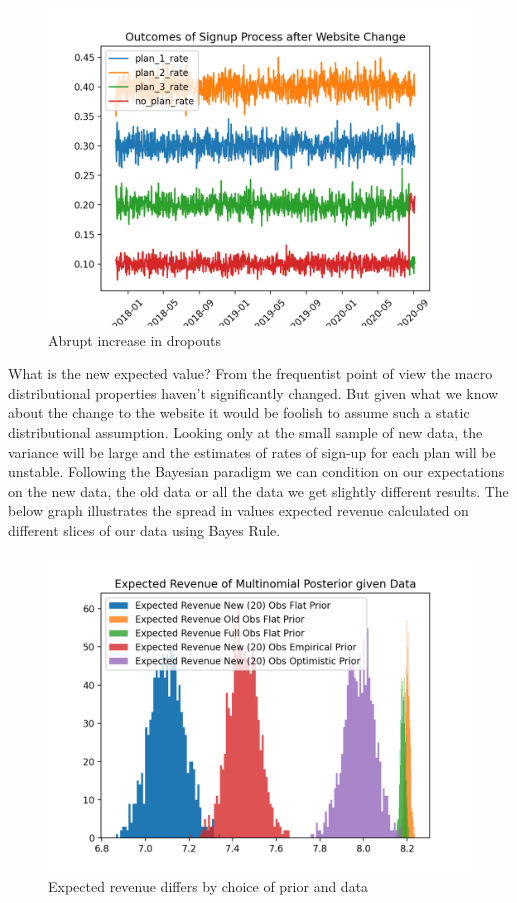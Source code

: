 \documentclass[10pt,a4paper,notitlepage, twocolumn]{article}
\begin{document}
\begin{figure}[H]
  \includegraphics[width=\linewidth]{./Plots/outcomes_of_signup_post.png}
  \caption{Abrupt increase in dropouts}
\end{figure}

What is the new expected value? From the frequentist point of view the macro distributional properties haven't significantly changed. But given what we know about the change to the website it would be foolish to assume such a static distributional assumption. Looking only at the small sample of new data, the variance will be large and the estimates of rates of sign-up for each plan will be unstable.  Following the Bayesian paradigm we can condition on our expectations on the new data, the old data or all the data we get slightly different results. The below graph illustrates the spread in values expected revenue calculated on different slices of our data using Bayes Rule.

\begin{figure}[H]
  \includegraphics[width=\linewidth]{./Plots/expected_revenue_distributions.png}
  \caption{Expected revenue differs by choice of prior and data}
\end{figure}
\end{document}
